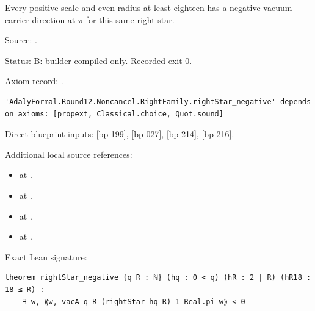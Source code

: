 \begin{theorem}[bp-217]
\label{bp-217}
\leanok
Every positive scale and even radius at least eighteen has a negative vacuum carrier direction at \(\pi\) for this same right star.

\par Source: \texttt{}.
\par Status: B: builder-compiled only. Recorded exit 0.
\par Axiom record: \texttt{}.
\begin{verbatim}
'AdalyFormal.Round12.Noncancel.RightFamily.rightStar_negative' depends on axioms: [propext, Classical.choice, Quot.sound]
\end{verbatim}
\par Direct blueprint inputs: \ref{bp-199}, \ref{bp-027}, \ref{bp-214}, \ref{bp-216}.
\par Additional local source references:
\begin{itemize}
\item \texttt{} at \texttt{}.
\item \texttt{} at \texttt{}.
\item \texttt{} at \texttt{}.
\item \texttt{} at \texttt{}.
\end{itemize}
\par Exact Lean signature:
\begin{verbatim}
theorem rightStar_negative {q R : ℕ} (hq : 0 < q) (hR : 2 ∣ R) (hR18 : 18 ≤ R) :
    ∃ w, ⟪w, vacA q R (rightStar hq R) 1 Real.pi w⟫ < 0
\end{verbatim}
\end{theorem}

